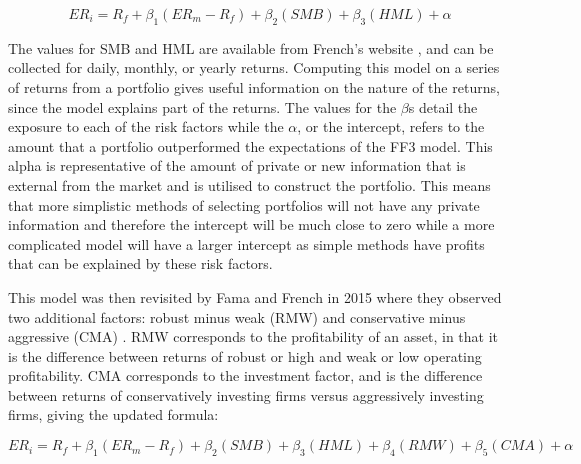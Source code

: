 \begin{equation*}
ER_i = R_f + \beta_1(ER_m -R_f) + \beta_2 (SMB) + \beta_3(HML) + \alpha
\end{equation*}

The values for SMB and HML are available from French's website \parencite{french_2022}, and can be collected for daily, monthly, or yearly returns. Computing this model on a series of returns from a portfolio gives useful information on the nature of the returns, since the model explains part of the returns. The values for the $\beta$s detail the exposure to each of the risk factors while the $\alpha$, or the intercept, refers to the amount that a portfolio outperformed the expectations of the FF3 model. This alpha is representative of the amount of private or new information that is external from the market and is utilised to construct the portfolio. This means that more simplistic methods of selecting portfolios will not have any private information and therefore the intercept will be much close to zero while a more complicated model will have a larger intercept as simple methods have profits that can be explained by these risk factors.

This model was then revisited by Fama and French in 2015 where they observed two additional factors: robust minus weak (RMW) and conservative minus aggressive (CMA) \parencite{ff5}. RMW corresponds to the profitability of an asset, in that it is the difference between returns of robust or high and weak or low operating profitability. CMA corresponds to the investment factor, and is the difference between returns of conservatively investing firms versus aggressively investing firms, giving the updated formula:

\begin{equation}
ER_i = R_f + \beta_1(ER_m -R_f) + \beta_2 (SMB) + \beta_3(HML) + \beta_4(RMW) + \beta_5(CMA) + \alpha
\end{equation}





